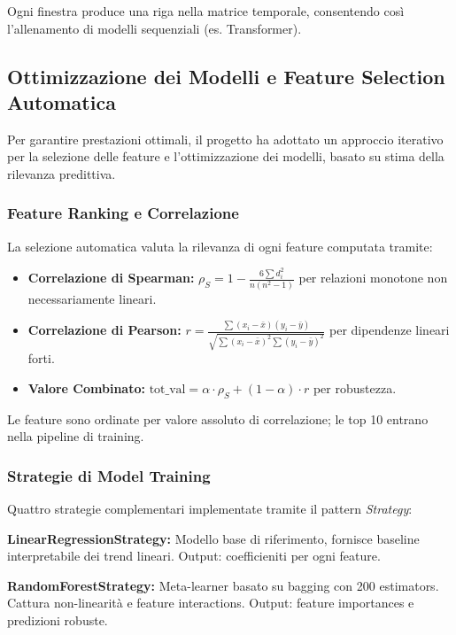 Ogni finestra produce una riga nella matrice temporale, consentendo così l'allenamento di modelli sequenziali (es. Transformer).

\subsection{Ottimizzazione dei Modelli e Feature Selection Automatica}

Per garantire prestazioni ottimali, il progetto ha adottato un approccio iterativo per la selezione delle feature e l'ottimizzazione dei modelli, basato su stima della rilevanza predittiva.

\subsubsection{Feature Ranking e Correlazione}

La selezione automatica valuta la rilevanza di ogni feature computata tramite:
\begin{itemize}
    \item \textbf{Correlazione di Spearman:} $\rho_S = 1 - \frac{6 \sum d_i^2}{n(n^2-1)}$ per relazioni monotone non necessariamente lineari.
    \item \textbf{Correlazione di Pearson:} $r = \frac{\sum (x_i - \bar{x})(y_i - \bar{y})}{\sqrt{\sum (x_i - \bar{x})^2 \sum (y_i - \bar{y})^2}}$ per dipendenze lineari forti.
    \item \textbf{Valore Combinato:} $\text{tot\_val} = \alpha \cdot \rho_S + (1-\alpha) \cdot r$ per robustezza.
\end{itemize}

Le feature sono ordinate per valore assoluto di correlazione; le top 10 entrano nella pipeline di training.

\subsubsection{Strategie di Model Training}

Quattro strategie complementari implementate tramite il pattern \textit{Strategy}:

\textbf{LinearRegressionStrategy:} Modello base di riferimento, fornisce baseline interpretabile dei trend lineari. Output: coefficieniti per ogni feature.

\textbf{RandomForestStrategy:} Meta-learner basato su bagging con 200 estimators. Cattura non-linearità e feature interactions. Output: feature importances e predizioni robuste.

